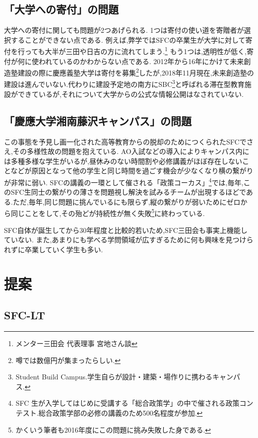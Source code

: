 \documentclass[uplatex, a4j]{jsarticle}
\begin{document}
\subsection{「大学への寄付」の問題}
  大学への寄付に関しても問題が2つあげられる.
  1つは寄付の使い道を寄贈者が選択することができない点である.
  例えば,弊学ではSFCの卒業生が大学に対して寄付を行っても大半が三田や日吉の方に流れてしまう.\footnote{メンター三田会 代表理事 宮地さん談}
  もう1つは,透明性が低く,寄付が何に使われているのかわからない点である.
  2012年から16年にかけて未来創造塾建設の際に慶應義塾大学は寄付を募集\footnote{噂では数億円が集まったらしい.}したが,2018年11月現在,未来創造塾の建設は進んでいない.代わりに建設予定地の南方にSBC\footnote{Student Build Campus.学生自らが設計・建築・場作りに携わるキャンパス.}と呼ばれる滞在型教育施設ができているが,それについて大学からの公式な情報公開はなされていない\cite{mirai}.


\subsection{「慶應大学湘南藤沢キャンパス」の問題}
  この事態を予見し画一化された高等教育からの脱却のためにつくられたSFC\cite{kakuitsu}でさえ,その多様性故の問題を抱えている.
  AO入試などの導入によりキャンパス内には多種多様な学生がいるが,昼休みのない時間割や必修講義がほぼ存在しないことなどが原因となって他の学生と同じ時間を過ごす機会が少なくなり横の繋がりが非常に弱い.
  SFCの講義の一環として催される「政策コーカス」\footnote{SFC
  生が入学してはじめに受講する「総合政策学」の中で催される政策コンテスト.総合政策学部の必修の講義のため500名程度が参加.}では,毎年,このSFC生同士の繋がりの薄さを問題視し解決を試みるチームが出現するほどである.ただ,毎年,同じ問題に挑んでいるにも限らず,縦の繋がりが弱いためにゼロから同じことをして,その殆どが持続性が無く失敗\footnote{かくいう筆者も2016年度にこの問題に挑み失敗した身である.}に終わっている.

  SFC自体が誕生してから30年程度と比較的若いため,SFC三田会も事実上機能していない.\cite{diamond}
  また,あまりにも学べる学問領域が広すぎるために何も興味を見つけられずに卒業していく学生も多い.



\section{提案}
\subsection{SFC-LT}
\end{document}
